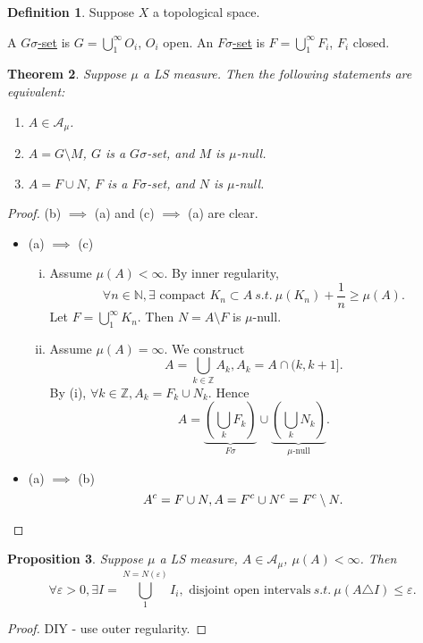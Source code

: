 \documentclass{report}
\newcommand{\Z}{\mathbb{Z}}
\newcommand{\N}{\mathbb{N}}
\newcommand{\st}{\ s.t.\ }
\newtheorem{theorem}{Theorem}[chapter]
\newtheorem{proposition}[theorem]{Proposition}
\theoremstyle{definition}
\newtheorem{definition}[theorem]{Definition}
\theoremstyle{remark}
\newcommand{\fnl}{\parbox[t]{0\linewidth}{}}
\begin{document}
\begin{definition}
	Suppose $X$ a topological space.

	A \underline{$G\sigma$-set} is $\displaystyle G = \bigcup_1^\infty O_i$, $O_i$ open. 
	An \underline{$F\sigma$-set} is $\displaystyle F = \bigcup_1^\infty F_i$, $F_i$ closed.
\end{definition}
\begin{theorem}
	Suppose $\mu$ a LS measure. Then the following statements are equivalent:
	\begin{enumerate}
		\item $A \in \mathcal{A}_\mu$.
		\item $A = G \setminus M$, $G$ is a $G\sigma$-set, and $M$ is $\mu$-null.
		\item $A = F \cup N$, $F$ is a $F\sigma$-set, and $N$ is $\mu$-null.
	\end{enumerate}
\end{theorem}
\begin{proof}
	(b) $\implies$ (a) and (c) $\implies$ (a) are clear.

	\begin{itemize}
		\item (a) $\implies$ (c) \fnl
		\begin{enumerate}[(i)]
			\item Assume $\mu(A) < \infty$. By inner regularity,
			\[
				\forall n \in \N, \exists \text{ compact } K_n \subset A \st \mu(K_n) + \frac{1}{n} \geq \mu(A).
			\]
			Let $F = \bigcup_1^\infty K_n$. Then $N = A \setminus F$ is $\mu$-null.
	
			\item 
			Assume $\mu(A) = \infty$.
			We construct
			\[
				A = \bigcup_{k \in \Z}A_k, A_k = A \cap (k, k+1].	
			\]
			By (i), $\forall k \in \Z, A_k = F_k \cup N_k$. Hence
			\[
				A = \underbrace{\left(\bigcup_k F_k\right)}_{F\sigma} \cup \underbrace{\left(\bigcup_k N_k\right)}_{\text{$\mu$-null}}.
			\]
		\end{enumerate}
		
		\item (a) $\implies$ (b)
		\[A^c = F \cup N, A = F^c \cup N^c = F^c \setminus N. \qedhere\]
	\end{itemize}
\end{proof}

\begin{proposition}
	Suppose $\mu$ a LS measure, $A \in \mathcal{A}_\mu$, $\mu(A) < \infty$. Then\[
		\forall \varepsilon > 0, \exists I = \bigcup_1^{N = N(\varepsilon)} I_i, \text{ disjoint open intervals} \st \mu(A \triangle I) \leq \varepsilon.	
	\]
\end{proposition}
\begin{proof}
	DIY - use outer regularity.
\end{proof}
\end{document}
